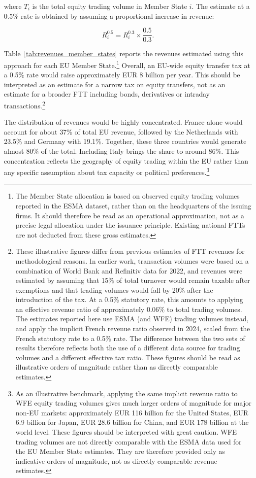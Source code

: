 \documentclass[../../main]{subfiles}
\begin{document}
\noindent where \(T_i\) is the total equity trading volume in Member State \(i\). The estimate at a 0.5\% rate is obtained by assuming a proportional increase in revenue:

\[
R_i^{0.5} = R_i^{0.3} \times \frac{0.5}{0.3}.
\]

Table~\ref{tab:revenues_member_states} reports the revenues estimated using this approach for each EU Member State.\footnote{The Member State allocation is based on observed equity trading volumes reported in the ESMA dataset, rather than on the headquarters of the issuing firms. It should therefore be read as an operational approximation, not as a precise legal allocation under the issuance principle. Existing national FTTs are not deducted from these gross estimates.} Overall, an EU-wide equity transfer tax at a 0.5\% rate would raise approximately EUR 8 billion per year. This should be interpreted as an estimate for a narrow tax on equity transfers, not as an estimate for a broader FTT including bonds, derivatives or intraday transactions.\footnote{These illustrative figures differ from previous estimates of FTT revenues \citep{CapelleBlancardPersaud2025} for methodological reasons. In earlier work, transaction volumes were based on a combination of World Bank and Refinitiv data for 2022, and revenues were estimated by assuming that 15\% of total turnover would remain taxable after exemptions and that trading volumes would fall by 20\% after the introduction of the tax. At a 0.5\% statutory rate, this amounts to applying an effective revenue ratio of approximately 0.06\% to total trading volumes. The estimates reported here use ESMA (and WFE) trading volumes instead, and apply the implicit French revenue ratio observed in 2024, scaled from the French statutory rate to a 0.5\% rate. The difference between the two sets of results therefore reflects both the use of a different data source for trading volumes and a different effective tax ratio. These figures should be read as illustrative orders of magnitude rather than as directly comparable estimates.}

The distribution of revenues would be highly concentrated. France alone would account for about 37\% of total EU revenue, followed by the Netherlands with 23.5\% and Germany with 19.1\%. Together, these three countries would generate almost 80\% of the total. Including Italy brings the share to around 86\%. This concentration reflects the geography of equity trading within the EU rather than any specific assumption about tax capacity or political preferences.\footnote{As an illustrative benchmark, applying the same implicit revenue ratio to WFE equity trading volumes gives much larger orders of magnitude for major non-EU markets: approximately EUR 116 billion for the United States, EUR 6.9 billion for Japan, EUR 28.6 billion for China, and EUR 178 billion at the world level. These figures should be interpreted with great caution. WFE trading volumes are not directly comparable with the ESMA data used for the EU Member State estimates. They are therefore provided only as indicative orders of magnitude, not as directly comparable revenue estimates.}
\end{document}
